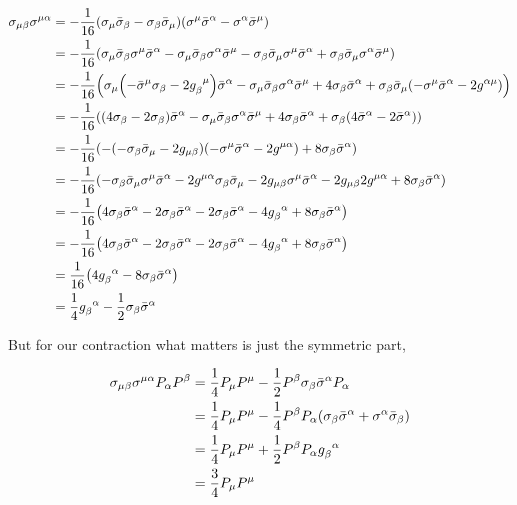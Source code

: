\begin{align}
    \sigma_{\mu\beta}\sigma^{\mu\alpha}&=-\frac{1}{16}\qty(\sigma_\mu{\bar\sigma}_\beta-\sigma_\beta{\bar\sigma}_\mu)\qty(\sigma^\mu{\bar\sigma}^\alpha-\sigma^\alpha{\bar\sigma}^\mu)\nonumber\\
    &=-\frac{1}{16}\qty(\sigma_\mu{\bar\sigma}_\beta\sigma^\mu{\bar\sigma}^\alpha-\sigma_\mu{\bar\sigma}_\beta\sigma^\alpha{\bar\sigma}^\mu-\sigma_\beta{\bar\sigma}_\mu\sigma^\mu{\bar\sigma}^\alpha+\sigma_\beta{\bar\sigma}_\mu\sigma^\alpha{\bar\sigma}^\mu)\nonumber\\
    &=-\frac{1}{16}\qty(\sigma_\mu\qty(-{\bar\sigma}^\mu\sigma_\beta-2\tensor{g}{_\beta^\mu}){\bar\sigma}^\alpha-\sigma_\mu{\bar\sigma}_\beta\sigma^\alpha{\bar\sigma}^\mu+4\sigma_\beta{\bar\sigma}^\alpha+\sigma_\beta{\bar\sigma}_\mu\qty(-\sigma^\mu{\bar\sigma}^\alpha-2g^{\alpha\mu}))\nonumber\\
    &=-\frac{1}{16}\qty(\qty(4\sigma_\beta-2\sigma_\beta){\bar\sigma}^\alpha-\sigma_\mu{\bar\sigma}_\beta\sigma^\alpha{\bar\sigma}^\mu+4\sigma_\beta{\bar\sigma}^\alpha+\sigma_\beta\qty(4{\bar\sigma}^\alpha-2{\bar\sigma}^\alpha))\nonumber\\
    &=-\frac{1}{16}\qty(-\qty(-\sigma_\beta{\bar\sigma}_\mu-2g_{\mu\beta})\qty(-\sigma^\mu{\bar\sigma}^\alpha-2g^{\mu\alpha})+8\sigma_\beta{\bar\sigma}^\alpha)\nonumber\\
    &=-\frac{1}{16}\qty(-\sigma_\beta{\bar\sigma}_\mu\sigma^\mu{\bar\sigma}^\alpha-2g^{\mu\alpha}\sigma_\beta{\bar\sigma}_\mu-2g_{\mu\beta}\sigma^\mu{\bar\sigma}^\alpha-2g_{\mu\beta}2g^{\mu\alpha}+8\sigma_\beta{\bar\sigma}^\alpha)\nonumber\\
    &=-\frac{1}{16}\qty(4\sigma_\beta{\bar\sigma}^\alpha-2\sigma_\beta{\bar\sigma}^\alpha-2\sigma_\beta{\bar\sigma}^\alpha-4\tensor{g}{_\beta^\alpha}+8\sigma_\beta{\bar\sigma}^\alpha)\nonumber\\
    &=-\frac{1}{16}\qty(4\sigma_\beta{\bar\sigma}^\alpha-2\sigma_\beta{\bar\sigma}^\alpha-2\sigma_\beta{\bar\sigma}^\alpha-4\tensor{g}{_\beta^\alpha}+8\sigma_\beta{\bar\sigma}^\alpha)\nonumber\\
    &=\frac{1}{16}\qty(4\tensor{g}{_\beta^\alpha}-8\sigma_\beta{\bar\sigma}^\alpha)\nonumber\\
    &=\frac14\tensor{g}{_\beta^\alpha}-\frac12\sigma_\beta{\bar\sigma^\alpha}\nonumber
\end{align}

But for our contraction what matters is just the symmetric part,

\begin{align}
    \sigma_{\mu\beta}\sigma^{\mu\alpha}P_\alpha P^\beta&=\frac14P_\mu P^\mu-\frac12 P^\beta\sigma_\beta{\bar\sigma}^\alpha P_\alpha\nonumber\\
    &=\frac14 P_\mu P^\mu-\frac14P^\beta P_\alpha\qty(\sigma_\beta{\bar\sigma}^\alpha+\sigma^\alpha{\bar\sigma}_\beta)\nonumber\\
    &=\frac14 P_\mu P^\mu+\frac12P^\beta P_\alpha\tensor{g}{_\beta^\alpha}\nonumber\\
    &=\frac34 P_\mu P^\mu\nonumber
\end{align}

